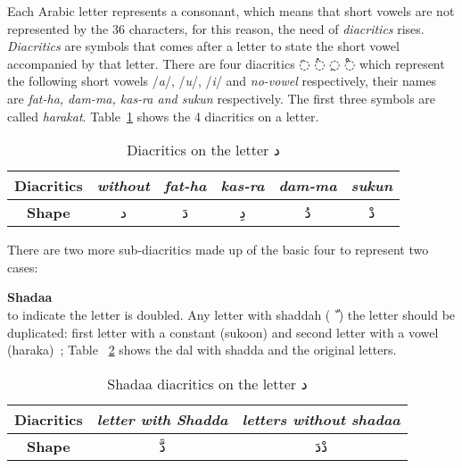 Each Arabic letter represents a consonant, which means that short vowels are not
represented by the 36 characters, for this reason, the need of \textit{diacritics}
rises. \textit{Diacritics} are symbols that comes after a letter to state the
short vowel accompanied by that letter. There are four diacritics \textarabic{◌َ} \textarabic{◌ُ}
\textarabic{◌ِ} \textarabic{◌ْ} which represent the following short vowels
/\textit{a}/, /\textit{u}/, /\textit{i}/ and \textit{no-vowel} respectively,
their names are \textit{fat-ha, dam-ma, kas-ra and sukun} respectively.  The first
three symbols are called \textit{harakat}. Table~\ref{tables:diacritics_dal}
shows the 4 diacritics on a letter.



\begin{table}[!t]
	\centering
	\begin{tabular}{c c c c c c}
		\toprule
		\textbf{\small{Diacritics}}     & \small{\textit{without}} & \small{\textit{fat-ha}} &
		\small{\textit{kas-ra}} & \small{\textit{dam-ma}} & \small{\textit{sukun}}\\
		\midrule
		\textbf{\small{Shape}}   & \textarabic{د} & \textarabic{دَ} & \textarabic{دِ} &
		\textarabic{دُ} & \textarabic{دْ}\\
		\bottomrule
	\end{tabular}
	\caption{Diacritics on the letter  \textarabic{ د }}\label{tables:diacritics_dal}
\end{table}



There are two more sub-diacritics made up of the basic four to represent two
cases:
\begin{definition}\label{def:shadaa_definition}
  \textbf{Shadaa}  \hfill \\
to indicate the letter is doubled. Any letter with
shaddah (\textarabic{ ّ } ) the letter should be duplicated: first letter with a
constant (sukoon) and second letter with a vowel (haraka)~\cite{Alnagdawi2013}; Table ~\ref{tables:shadda_dal}
shows the dal with shadda and the original letters.

\begin{table}[!t]
	\centering
	\begin{tabular}{c c c}
		\toprule
		\textbf{\small{Diacritics}} & \small{\textit{letter with Shadda }} & \small{\textit{letters without shadaa  }} \\
		\midrule
		\textbf{\small{Shape}}  & \textarabic{دَّ} &  \textarabic{دْدَ}\\
		\bottomrule
	\end{tabular}
	\caption{Shadaa diacritics on the letter  \textarabic{ د }}\label{tables:shadda_dal}
\end{table}

\end{definition}


